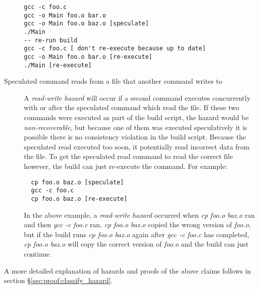 \begin{description}
\begin{verbatim}
gcc -c foo.c
gcc -o Main foo.o bar.o
gcc -o Main foo.o baz.o [speculate]
./Main
-- re-run build
gcc -c foo.c [ don't re-execute because up to date]
gcc -o Main foo.o bar.o [re-execute]
./Main [re-execute]
\end{verbatim}



\item [Speculated command reads from a file that another command writes to]
    A \emph{read-write hazard} will occur if a second command executes concurrently with or after the speculated command which read the file.  If these two commands were executed as part of the build script, the hazard would be \emph{non-recoverable}, but because one of them was executed speculatively it is possible there is no consistency violation in the build script.  Because the speculated read executed too soon, it potentially read incorrect data from the file.  To get the speculated read command to read the correct file however, the build can just re-execute the command. For example:

\begin{verbatim}
  cp foo.o baz.o [speculate]
  gcc -c foo.c
  cp foo.o baz.o [re-execute]
\end{verbatim}

In the above example, a \emph{read-write hazard} occurred when \emph{cp foo.o baz.o} ran and then \emph{gcc -c foo.c} ran.  \emph{cp foo.o baz.o} copied the wrong version of \emph{foo.o}, but if the build
runs \emph{cp foo.o baz.o} again after \emph{gcc -c foo.c} has completed, \emph{cp foo.o baz.o} will copy the correct version of \emph{foo.o} and the build can just continue.
\end{description}

A more detailed explanation of hazards and proofs of the above claims follows in section \S\ref{sec:proof:classify_hazard}.

